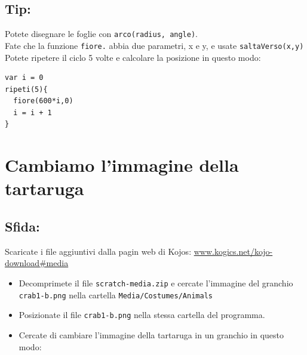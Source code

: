   
\section*{\color{OliveGreen}Tip:}
Potete disegnare le foglie con \lstinline{arco(radius, angle)}. \\
Fate che la funzione \lstinline{fiore.} abbia due parametri, x e y, e usate \lstinline{saltaVerso(x,y)}\\
Potete ripetere il ciclo 5 volte e calcolare la posizione in questo modo:

\begin{lstlisting}[basicstyle={\ttfamily\fontsize{18}{22}\selectfont},numbers=none]
var i = 0          
ripeti(5){
  fiore(600*i,0)
  i = i + 1        
}
\end{lstlisting}
        
\chapter{Cambiamo l'immagine della tartaruga}\section*{\color{BrickRed}Sfida:}
Scaricate i file aggiuntivi dalla pagin web di Kojos:
\href{http://www.kogics.net/kojo-download#media}{www.kogics.net/kojo-download\#media}


\begin{itemize}

\item {Decomprimete il file \lstinline{scratch-media.zip} e cercate l'immagine del granchio \lstinline{crab1-b.png} nella cartella \lstinline{Media/Costumes/Animals}}
\item {Posizionate il file \lstinline{crab1-b.png} nella stessa cartella del programma.}
\item {Cercate di cambiare l'immagine della tartaruga in un granchio in questo modo:}

\end{itemize}



